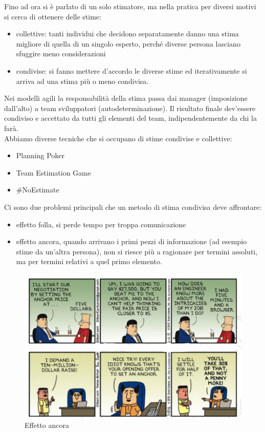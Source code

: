 Fino ad ora si è parlato di un solo stimatore, ma nella pratica per diversi motivi si cerca di ottenere delle stime:
\begin{itemize}
    \item collettive: tanti individui che decidono separatamente danno una stima migliore di quella di un singolo esperto, perché diverse persona lasciano sfuggire meno considerazioni
    \item condivise: si fanno mettere d'accordo le diverse stime ed iterativamente si arriva ad una stima più o meno condivisa.
\end{itemize}
Nei modelli agili la responsabilità della stima passa dai manager (imposizione dall'alto) a team sviluppatori (autodeterminazione).  Il risultato finale dev'essere condiviso e accettato da tutti gli elementi del team, indipendentemente da chi la farà.\\
Abbiamo diverse tecniche che si occupano di stime condivise e collettive:
\begin{itemize}
    \item Planning Poker
    \item Team Estimation Game
    \item \#NoEstimate
\end{itemize}

Ci sono due problemi principali che un metodo di stima condivisa deve affrontare:
\begin{itemize}
    \item effetto folla, si perde tempo per troppa comunicazione
    \item effetto ancora, quando arrivano i primi pezzi di informazione (ad esempio stime da un'altra persona), non si riesce più a ragionare per termini assoluti, ma per termini relativi a quel primo elemento. 
\end{itemize}

\begin{figure}[H]
	\centering
	 \includegraphics[scale=0.7]{img/effettoancora.png}
	 \caption{Effetto ancora}
\end{figure}

